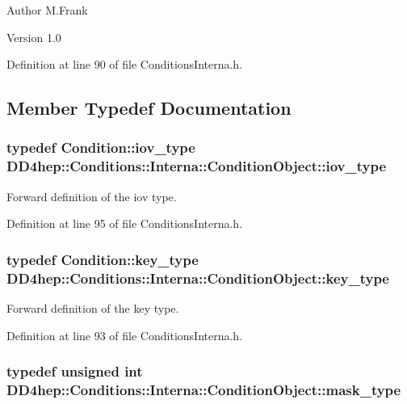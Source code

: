 \begin{DoxyAuthor}{Author}
M.Frank 
\end{DoxyAuthor}
\begin{DoxyVersion}{Version}
1.0 
\end{DoxyVersion}


Definition at line 90 of file ConditionsInterna.h.

\subsection{Member Typedef Documentation}
\hypertarget{class_d_d4hep_1_1_conditions_1_1_interna_1_1_condition_object_a6d54716450a73a1a439ca06445f56d24}{
\subsubsection[{iov\_\-type}]{\setlength{\rightskip}{0pt plus 5cm}typedef {\bf Condition::iov\_\-type} {\bf DD4hep::Conditions::Interna::ConditionObject::iov\_\-type}}}
\label{class_d_d4hep_1_1_conditions_1_1_interna_1_1_condition_object_a6d54716450a73a1a439ca06445f56d24}


Forward definition of the iov type. 

Definition at line 95 of file ConditionsInterna.h.\hypertarget{class_d_d4hep_1_1_conditions_1_1_interna_1_1_condition_object_a61a3251d047bd75dcdebb0e1c1409101}{
\subsubsection[{key\_\-type}]{\setlength{\rightskip}{0pt plus 5cm}typedef {\bf Condition::key\_\-type} {\bf DD4hep::Conditions::Interna::ConditionObject::key\_\-type}}}
\label{class_d_d4hep_1_1_conditions_1_1_interna_1_1_condition_object_a61a3251d047bd75dcdebb0e1c1409101}


Forward definition of the key type. 

Definition at line 93 of file ConditionsInterna.h.\hypertarget{class_d_d4hep_1_1_conditions_1_1_interna_1_1_condition_object_a1a9ff63fe2e060b973e6c2994b0a1370}{
\subsubsection[{mask\_\-type}]{\setlength{\rightskip}{0pt plus 5cm}typedef unsigned int {\bf DD4hep::Conditions::Interna::ConditionObject::mask\_\-type}}}
\label{class_d_d4hep_1_1_conditions_1_1_interna_1_1_condition_object_a1a9ff63fe2e060b973e6c2994b0a1370}


